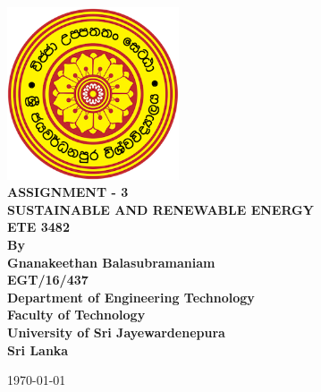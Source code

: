 \documentclass[12pt,a4paper]{article}
\begin{document}
\begin{titlepage}


\begin{flushright}
\end{flushright}


\center %
{
\includegraphics[width=2in,keepaspectratio]{logo.png}\\[0.5cm]
\fontsize{24pt}{30}\selectfont \textbf{\uppercase{Assignment - 3}}\\[1.5cm]
\fontsize{16}{24}\selectfont \textbf{\uppercase{Sustainable and Renewable Energy}}\\[1.5cm]
\fontsize{16pt}{24}\selectfont \textbf{ETE 3482}\\[0.75cm]
\fontsize{16pt}{24}\selectfont \textbf{By}\\[0.5cm]
\fontsize{12pt}{12}\selectfont \textbf { Gnanakeethan Balasubramaniam \\ EGT/16/437}\\[0.5cm]

\vspace*{\fill}
\fontsize{12pt}{12}\selectfont \textbf {Department of Engineering Technology \\ Faculty of Technology\\University of Sri Jayewardenepura\\ Sri Lanka \\ }
\vspace*{\fill}

\today
}



\end{titlepage}
\end{document}
